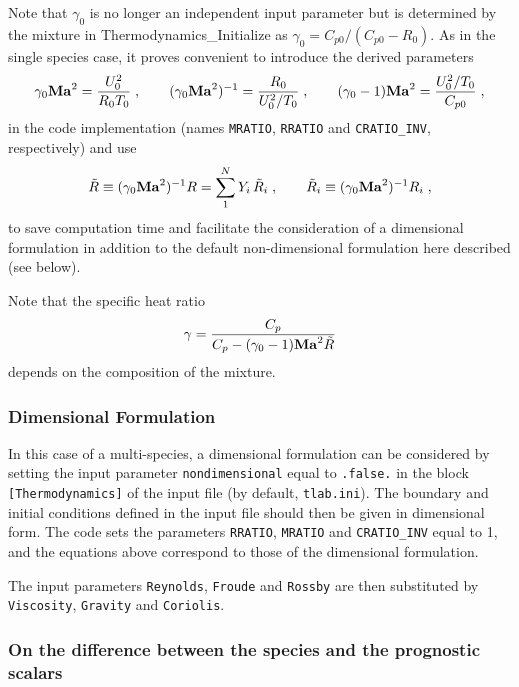 Note that $\gamma_0$ is no longer an independent input parameter but is determined by the mixture in {Thermodynamics\_Initialize} as $\gamma_0=C_{p0}/(C_{p0}-R_0)$. As in the single species case, it proves convenient to introduce the derived parameters
\begin{equation}
    \gamma_0\mathrm{\bf Ma}^2=\frac{U_0^2}{R_0T_0}\;,\qquad (\gamma_0\mathrm{\bf Ma}^2)^{-1}=\frac{R_0}{U^2_0/T_0}\;,\qquad (\gamma_0-1)\mathrm{\bf Ma}^2 =\frac{U_0^2/T_0}{C_{p0}} \;,
\end{equation}
in the code implementation (names \texttt{MRATIO}, \texttt{RRATIO} and \texttt{CRATIO\_INV}, respectively) and use 
\begin{equation}
    \tilde{R}\equiv (\gamma_0\mathrm{\bf Ma}^2)^{-1}R=\sum_1^NY_i\,\tilde{R}_i\;,\qquad\tilde{R}_i\equiv (\gamma_0\mathrm{\bf Ma}^2)^{-1}R_i
    \;,
\end{equation}
to save computation time and facilitate the consideration of a dimensional formulation in addition to the default non-dimensional formulation here described (see below). 

Note that the specific heat ratio
\begin{equation}
    \gamma=\frac{C_p}{C_p-(\gamma_0-1)\mathrm{\bf Ma}^2\tilde{R}}
\end{equation}
depends on the composition of the mixture.

\subsubsection{Dimensional Formulation}

In this case of a multi-species, a dimensional formulation can be considered by setting the input parameter \texttt{nondimensional} equal to \texttt{.false.} in the block \texttt{[Thermodynamics]} of the input file (by default, \texttt{tlab.ini}). The boundary and initial conditions defined in the input file should then be given in dimensional form. The code sets the parameters \texttt{RRATIO}, \texttt{MRATIO} and \texttt{CRATIO\_INV} equal to 1, and the equations above correspond to those of the dimensional formulation. %

The input parameters \texttt{Reynolds}, \texttt{Froude} and \texttt{Rossby} are then substituted by \texttt{Viscosity}, \texttt{Gravity} and \texttt{Coriolis}.

\subsubsection{On the difference between the species and the prognostic scalars}

